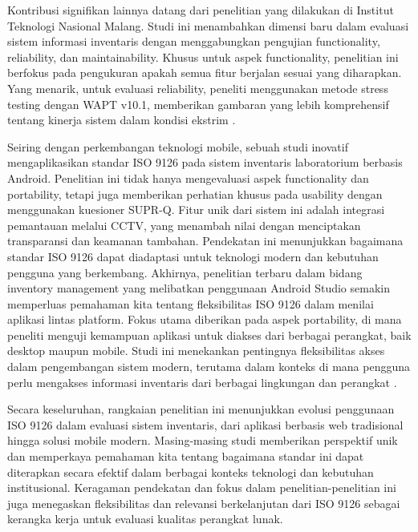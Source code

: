 Kontribusi signifikan lainnya datang dari penelitian yang dilakukan di Institut Teknologi Nasional Malang. Studi ini menambahkan dimensi baru dalam evaluasi sistem informasi inventaris dengan menggabungkan pengujian functionality, reliability, dan maintainability. Khusus untuk aspek functionality, penelitian ini berfokus pada pengukuran apakah semua fitur berjalan sesuai yang diharapkan. Yang menarik, untuk evaluasi reliability, peneliti menggunakan metode stress testing dengan WAPT v10.1, memberikan gambaran yang lebih komprehensif tentang kinerja sistem dalam kondisi ekstrim \cite{kumalasari2024analisis}.

Seiring dengan perkembangan teknologi mobile, sebuah studi inovatif mengaplikasikan standar ISO 9126 pada sistem inventaris laboratorium berbasis Android. Penelitian ini tidak hanya mengevaluasi aspek functionality dan portability, tetapi juga memberikan perhatian khusus pada usability dengan menggunakan kuesioner SUPR-Q. Fitur unik dari sistem ini adalah integrasi pemantauan melalui CCTV, yang menambah nilai dengan menciptakan transparansi dan keamanan tambahan. Pendekatan ini menunjukkan bagaimana standar ISO 9126 dapat diadaptasi untuk teknologi modern dan kebutuhan pengguna yang berkembang.
Akhirnya, penelitian terbaru dalam bidang inventory management yang melibatkan penggunaan Android Studio semakin memperluas pemahaman kita tentang fleksibilitas ISO 9126 dalam menilai aplikasi lintas platform. Fokus utama diberikan pada aspek portability, di mana peneliti menguji kemampuan aplikasi untuk diakses dari berbagai perangkat, baik desktop maupun mobile. Studi ini menekankan pentingnya fleksibilitas akses dalam pengembangan sistem modern, terutama dalam konteks di mana pengguna perlu mengakses informasi inventaris dari berbagai lingkungan dan perangkat \cite{alkodri2023pengaplikasian}.

Secara keseluruhan, rangkaian penelitian ini menunjukkan evolusi penggunaan ISO 9126 dalam evaluasi sistem inventaris, dari aplikasi berbasis web tradisional hingga solusi mobile modern. Masing-masing studi memberikan perspektif unik dan memperkaya pemahaman kita tentang bagaimana standar ini dapat diterapkan secara efektif dalam berbagai konteks teknologi dan kebutuhan institusional. Keragaman pendekatan dan fokus dalam penelitian-penelitian ini juga menegaskan fleksibilitas dan relevansi berkelanjutan dari ISO 9126 sebagai kerangka kerja untuk evaluasi kualitas perangkat lunak.
